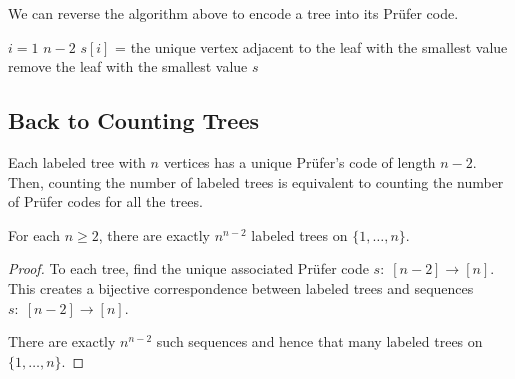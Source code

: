 We can reverse the algorithm above to encode a tree into its Pr\"ufer code.

\begin{codebox}
    \li \For $i = 1$ \To $n-2$ \Do
        \li $s[i]$ = the unique vertex adjacent to the leaf with the smallest value
        \li remove the leaf with the smallest value
    \End
    \li \Return $s$
\end{codebox}

\subsection{Back to Counting Trees}

Each labeled tree with $n$ vertices has a unique Pr\"ufer's code of length $n-2$. Then, counting the number of labeled trees is equivalent to counting the number of Pr\"ufer codes for all the trees.

\begin{theorem}
    For each $n \geq 2$, there are exactly $n^{n-2}$ labeled trees on $\{1,\ldots,n\}$.
\end{theorem}

\begin{proof}
    To each tree, find the unique associated Pr\"ufer code $s:\; [n-2] \to [n]$. This creates a bijective correspondence between labeled trees and sequences $s:\; [n-2] \to [n]$.

    There are exactly $n^{n-2}$ such sequences and hence that many labeled trees on $\{1,\ldots,n\}$.
\end{proof}